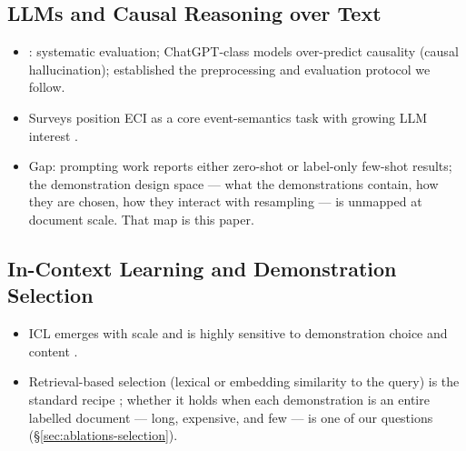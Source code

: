\documentclass[11pt]{article}
\begin{document}
\subsection{LLMs and Causal Reasoning over Text}
\begin{itemize}
  \item \citet{gao2023chatgpt}: systematic evaluation; ChatGPT-class models
        over-predict causality (causal hallucination); established the
        preprocessing and evaluation protocol we follow.
  \item Surveys position ECI as a core event-semantics task with growing
        LLM interest \citep{cheng2025survey}.
  \item Gap: prompting work reports either zero-shot or label-only few-shot
        results; the demonstration design space --- what the demonstrations
        contain, how they are chosen, how they interact with resampling ---
        is unmapped at document scale. That map is this paper.
\end{itemize}

\subsection{In-Context Learning and Demonstration Selection}
\begin{itemize}
  \item ICL emerges with scale \citep{brown2020language} and is highly
        sensitive to demonstration choice and content
        \citep{liu2022makes, min2022rethinking}.
  \item Retrieval-based selection (lexical or embedding similarity to the
        query) is the standard recipe \citep{liu2022makes}; whether it holds
        when each demonstration is an entire labelled document --- long,
        expensive, and few --- is one of our questions
        (\S\ref{sec:ablations-selection}).
\end{itemize}
\end{document}
